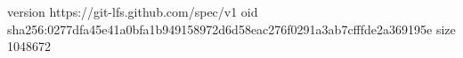 version https://git-lfs.github.com/spec/v1
oid sha256:0277dfa45e41a0bfa1b949158972d6d58eac276f0291a3ab7cfffde2a369195e
size 1048672

